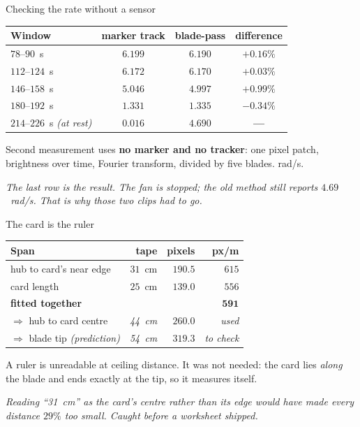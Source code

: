 \documentclass[aspectratio=169,10pt]{beamer}
\newcommand{\takeaway}[1]{\vfill{\footnotesize\itshape\color{cGrey}#1\par}}
\begin{document}
\begin{frame}{Checking the rate without a sensor}
\vfill
\begin{center}
\small
\renewcommand{\arraystretch}{1.3}
\begin{tabular}{@{}lccc@{}}
\toprule
\rowcolor{cMeas!12}
\textbf{Window} & \textbf{marker track} & \textbf{blade-pass} & \textbf{difference} \\
\midrule
$78$--$90$~s   & $6.199$ & $6.190$ & $\mathbf{+0.16\%}$ \\
$112$--$124$~s & $6.172$ & $6.170$ & $\mathbf{+0.03\%}$ \\
$146$--$158$~s & $5.046$ & $4.997$ & $+0.99\%$ \\
$180$--$192$~s & $1.331$ & $1.335$ & $-0.34\%$ \\
\midrule
\rowcolor{cAccent!8}
$214$--$226$~s \emph{(at rest)} & $\mathbf{0.016}$ & $\mathbf{4.690}$ & {\color{cAccent}\textbf{---}} \\
\bottomrule
\end{tabular}
\end{center}
\vfill
\begin{center}
{\footnotesize Second measurement uses \textbf{no marker and no tracker}: one pixel patch,
brightness over time, Fourier transform, divided by five blades. rad/s.}
\end{center}
\takeaway{The last row is the result. The fan is stopped; the old method still reports
$4.69$~rad/s. That is why those two clips had to go.}
\end{frame}

\begin{frame}{The card is the ruler}
\vfill
\begin{center}
\small
\renewcommand{\arraystretch}{1.3}
\begin{tabular}{@{}lrrr@{}}
\toprule
\rowcolor{cPed!12}
\textbf{Span} & \textbf{tape} & \textbf{pixels} & \textbf{px/m} \\
\midrule
hub to card's near edge & $31$~cm & $190.5$ & $615$ \\
card length & $25$~cm & $139.0$ & $556$ \\
\midrule
\rowcolor{cApp!10}
\textbf{fitted together} & & & $\mathbf{591}$ \\
\midrule
$\Rightarrow$ hub to card centre & \emph{44~cm} & $260.0$ & \emph{used} \\
$\Rightarrow$ blade tip \emph{(prediction)} & \emph{54~cm} & $319.3$ & \emph{to check} \\
\bottomrule
\end{tabular}
\end{center}
\vfill
\begin{center}
{\footnotesize A ruler is unreadable at ceiling distance. It was not needed: the card lies
\emph{along} the blade and ends exactly at the tip, so it measures itself.}
\end{center}
\takeaway{Reading ``31~cm'' as the card's \emph{centre} rather than its \emph{edge} would have
made every distance $29\%$ too small. Caught before a worksheet shipped.}
\end{frame}
\end{document}
